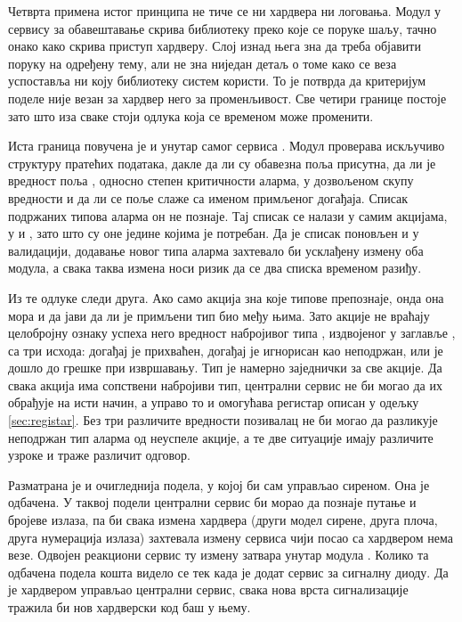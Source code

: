 \documentclass[12pt,oneside]{memoir}
\begin{document}
Четврта примена истог принципа не тиче се ни хардвера ни логовања. Модул
 у сервису за обавештавање скрива библиотеку преко које се поруке шаљу,
тачно онако како  скрива приступ хардверу. Слој изнад њега зна да треба
објавити поруку на одређену тему, али не зна ниједан детаљ о томе како се веза успоставља
ни коју библиотеку систем користи. То је потврда да критеријум поделе није везан за хардвер
него за променљивост. Све четири границе постоје зато што иза сваке стоји одлука која се
временом може променити.

Иста граница повучена је и унутар самог сервиса . Модул
 проверава искључиво структуру пратећих података, дакле да ли су
обавезна поља присутна, да ли је вредност поља , односно степен критичности аларма,
у дозвољеном скупу вредности и да ли се поље
 слаже са именом примљеног догађаја. Списак подржаних типова аларма он не
познаје. Тај списак се налази у самим акцијама, у  и ,
зато што су оне једине којима је потребан. Да је списак поновљен и у валидацији, додавање
новог типа аларма захтевало би усклађену измену оба модула, а свака таква измена носи
ризик да се два списка временом разиђу.

Из те одлуке следи друга. Ако само акција зна које типове препознаје, онда она мора и да
јави да ли је примљени тип био међу њима. Зато акције не враћају целобројну ознаку успеха
него вредност набројивог типа , издвојеног у заглавље
, са три исхода: догађај је прихваћен, догађај је игнорисан као
неподржан, или је дошло до грешке при извршавању. Тип је намерно заједнички за све акције.
Да свака акција има сопствени набројиви тип, централни сервис не би могао да их обрађује на
исти начин, а управо то и омогућава регистар описан у одељку \ref{sec:registar}. Без три различите вредности позивалац не би могао да разликује
неподржан тип аларма од неуспеле акције, а те две ситуације имају различите узроке и траже
различит одговор.

Разматрана је и очигледнија подела, у којој би  сам управљао
сиреном. Она је одбачена. У таквој подели централни сервис би морао да познаје
 путање и бројеве излаза, па би свака измена хардвера (други модел сирене,
друга плоча, друга нумерација излаза) захтевала измену сервиса чији посао са хардвером
нема везе. Одвојен реакциони сервис ту измену затвара унутар модула .
Колико та одбачена подела кошта видело се тек када је додат сервис за сигналну диоду. Да је
хардвером управљао централни сервис, свака нова врста сигнализације тражила би нов
хардверски код баш у њему.
\end{document}
